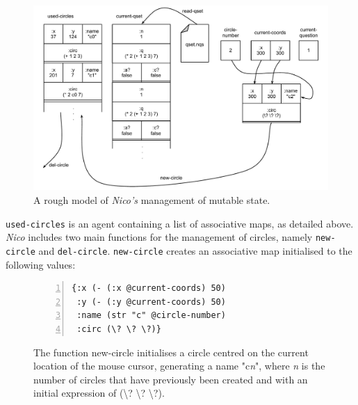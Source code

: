 \documentclass[12pt,twoside,notitlepage,xetex]{report}
\begin{document}
\begin{center}
\begin{figure}[H]
\begin{center}
\includegraphics[width=\textwidth-2cm]{figs/nico_backend.pdf}
\end{center}
\caption{A rough model of \emph{Nico's} management of mutable state.}
\end{figure}
\end{center}

\verb¬used-circles¬ is an agent containing a list of associative maps, as
detailed above.  \emph{Nico} includes two main functions for the management of
circles, namely \verb¬new-circle¬ and \verb¬del-circle¬.  \verb¬new-circle¬
creates an associative map initialised to the following values:

\begin{center}
\begin{figure}[H]
\begin{center}
\begin{minipage}{2.5in}%
\begin{Verbatim}[fontsize=\small,numbers=left]
{:x (- (:x @current-coords) 50)
 :y (- (:y @current-coords) 50)
 :name (str "c" @circle-number)
 :circ (\? \? \?)}
\end{Verbatim}
\end{minipage}
\end{center}
\caption{The function {\ttfamily new-circle} initialises a circle centred on the current location of the mouse cursor, generating a name {\ttfamily "c}\emph{n}{\ttfamily "}, where \emph{n} is the number of circles that have previously been created and with an initial expression of {\ttfamily (\textbackslash? \textbackslash? \textbackslash?)}.}
\end{figure}
\end{center}
\end{document}
